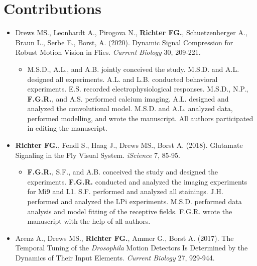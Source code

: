 \chapter*{Contributions}

\begin{itemize}
    
    \item Drews MS., Leonhardt A., Pirogova N., \textbf{Richter FG.}, Schuetzenberger A., Braun L., Serbe E., Borst, A. (2020). Dynamic Signal Compression for Robust Motion Vision in Flies. \textit{Current Biology} 30, 209-221.
    
    \begin{itemize}
        \item
        M.S.D., A.L., and A.B. jointly conceived the study. M.S.D. and A.L. designed all experiments. A.L. and L.B. conducted behavioral experiments. E.S. recorded electrophysiological responses. M.S.D., N.P., \textbf{F.G.R.}, and A.S. performed calcium imaging. A.L. designed and analyzed the convolutional model. M.S.D. and A.L. analyzed data, performed modelling, and wrote the manuscript. All authors participated in editing the manuscript.
    \end{itemize}
    
    \item \textbf{Richter FG.}, Fendl S., Haag J., Drews MS., Borst A. (2018). Glutamate Signaling in the Fly Visual System. \textit{iScience} 7, 85-95.
    
    \begin{itemize}
        \item
        \textbf{F.G.R.}, S.F., and A.B. conceived the study and designed the experiments. \textbf{F.G.R.} conducted and analyzed the imaging experiments for Mi9 and L1. S.F. performed and analyzed all stainings. J.H. performed and analyzed the LPi experiments. M.S.D. performed data analysis and model fitting of the receptive fields. F.G.R. wrote the manuscript with the
help of all authors.
    \end{itemize}
    
    \item Arenz A., Drews MS., \textbf{Richter FG.}, Ammer G., Borst A. (2017). The Temporal Tuning of the \textit{Drosophila} Motion Detectors Is Determined by the Dynamics of Their Input Elements. \textit{Current Biology} 27, 929-944.
    

\end{itemize}
